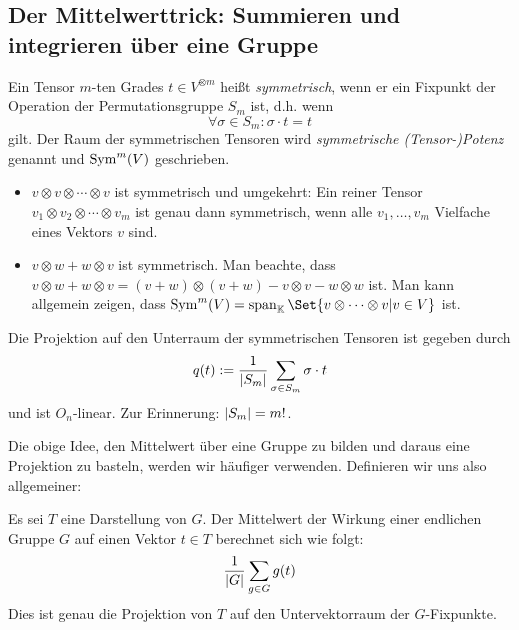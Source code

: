 \subsection{Der Mittelwerttrick: Summieren und integrieren über eine Gruppe}

\begin{definition}
	\label{symmetrische_tensoren:def}
Ein Tensor $m$-ten Grades $t\in V^{\otimes m}$ heißt \emph{symmetrisch}, wenn er ein Fixpunkt der Operation der Permutationsgruppe $S_m$ ist, d.h. wenn
\[\forall \sigma\in S_m: \sigma\cdot t = t\]
gilt. Der Raum der symmetrischen Tensoren wird \emph{symmetrische (Tensor-)Potenz} genannt und $\operatorname{Sym}^m(V)$ geschrieben.
\end{definition}

\begin{example}
\begin{itemize}
\item $v\otimes v\otimes \cdots\otimes v$ ist symmetrisch und umgekehrt: Ein reiner Tensor $v_1\otimes v_2\otimes\cdots\otimes v_m$ ist genau dann symmetrisch, wenn alle $v_1,\ldots, v_m$ Vielfache eines Vektors $v$ sind.
\item $v\otimes w + w\otimes v$ ist symmetrisch. Man beachte, dass $v\otimes w + w\otimes v = (v+w)\otimes(v+w) - v\otimes v - w\otimes w$ ist. Man kann allgemein zeigen, dass $\Sym^m(V) = \operatorname{span}_\IK\Set{v\otimes\cdots\otimes v | v\in V}$ ist.
\end{itemize}
\end{example}

\begin{lemma}[Mittelwerttrick]\label{symmetrische_tensoren:projektion}
Die Projektion auf den Unterraum der symmetrischen Tensoren ist gegeben durch
\[q(t) := \frac{1}{\lvert S_m\rvert} \sum_{\sigma\in S_m} \sigma\cdot t\]
und ist $O_n$-linear. Zur Erinnerung: $\lvert S_m\rvert = m!$.
\end{lemma}
Die obige Idee, den Mittelwert über eine Gruppe zu bilden und daraus eine Projektion zu basteln, werden wir häufiger verwenden. Definieren wir uns also allgemeiner:
\begin{definition}
	Es sei $T$ eine Darstellung von $G$. Der Mittelwert der Wirkung einer endlichen Gruppe $G$ auf einen Vektor $t\in T$ berechnet sich wie folgt:
	\[
		\frac{1}{\lvert G\rvert} \sum_{g\in G} g(t)
	\]
	Dies ist genau die Projektion von $T$ auf den Untervektorraum der $G$-Fixpunkte.
\end{definition}

